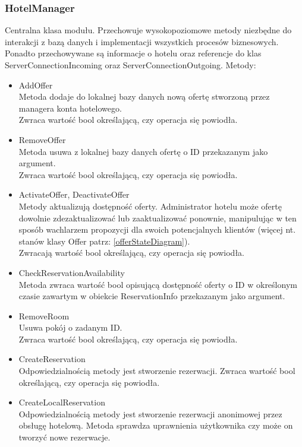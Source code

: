 \documentclass{article}
\begin{document}
\subsubsection{HotelManager}
Centralna klasa modułu. Przechowuje wysokopoziomowe metody niezbędne do interakcji z bazą danych i implementacji wszystkich procesów biznesowych. Ponadto przechowywane są informacje o hotelu oraz referencje do klas ServerConnectionIncoming oraz ServerConnectionOutgoing.
Metody:
\begin{itemize}
    \item AddOffer\\
    Metoda dodaje do lokalnej bazy danych nową ofertę stworzoną przez managera konta hotelowego.\\
    Zwraca wartość bool określającą, czy operacja się powiodła.
    \item RemoveOffer\\
    Metoda usuwa z lokalnej bazy danych ofertę o ID przekazanym jako argument.\\
    Zwraca wartość bool określającą, czy operacja się powiodła.
    \item ActivateOffer, DeactivateOffer\\
    Metody aktualizują dostępność oferty. Administrator hotelu może ofertę dowolnie zdezaktuali\-zować lub zaaktualizować ponownie, manipulując w ten sposób wachlarzem propozycji dla swoich potencjalnych klientów (więcej nt. stanów klasy Offer patrz: \ref{offerStateDiagram}).\\
    Zwracają wartość bool określającą, czy operacja się powiodła.
    \item CheckReservationAvailability\\
    Metoda zwraca wartość bool opisującą dostępność oferty o ID w określonym czasie zawartym w obiekcie ReservationInfo przekazanym jako argument.
    \item RemoveRoom\\
    Usuwa pokój o zadanym ID.\\
    Zwraca wartość bool określającą, czy operacja się powiodła.
    \item CreateReservation\\
    Odpowiedzialnością metody jest stworzenie rezerwacji.
    Zwraca wartość bool określającą, czy operacja się powiodła.
    \item CreateLocalReservation\\
    Odpowiedzialnością metody jest stworzenie rezerwacji anonimowej przez obsługę hotelową. Metoda sprawdza uprawnienia użytkownika czy może on tworzyć nowe rezerwacje.

\end{itemize}
\end{document}
